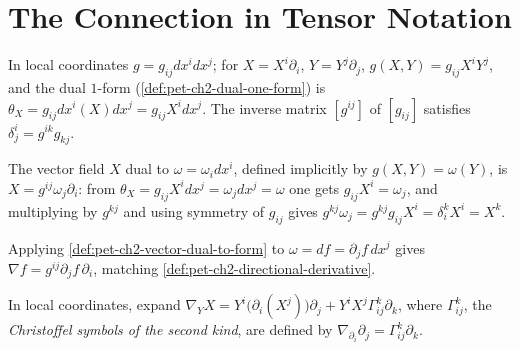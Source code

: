 \section{The Connection in Tensor Notation}

\begin{definition}
  \label{def:pet-ch2-metric-coordinate-formulas}
  \leanok
  In local coordinates $g=g_{ij}dx^idx^j$; for $X=X^i\partial_i$, $Y=Y^j\partial_j$,
  $g(X,Y)=g_{ij}X^iY^j$, and the dual $1$-form (\cref{def:pet-ch2-dual-one-form})
  is $\theta_X=g_{ij}dx^i(X)dx^j=g_{ij}X^idx^j$. The inverse matrix $[g^{ij}]$ of
  $[g_{ij}]$ satisfies $\delta^i_j=g^{ik}g_{kj}$.
\end{definition}

\begin{definition}
  \label{def:pet-ch2-vector-dual-to-form}
  \leanok
  The vector field $X$ dual to $\omega=\omega_idx^i$, defined implicitly by
  $g(X,Y)=\omega(Y)$, is $X=g^{ij}\omega_j\partial_i$: from $\theta_X=g_{ij}X^idx^j=\omega_jdx^j=\omega$
  one gets $g_{ij}X^i=\omega_j$, and multiplying by $g^{kj}$ and using symmetry
  of $g_{ij}$ gives $g^{kj}\omega_j=g^{kj}g_{ij}X^i=\delta^k_iX^i=X^k$.
\end{definition}

\begin{remark}
  \label{rem:pet-ch2-gradient-coordinate-formula}
  \leanok
  Applying \cref{def:pet-ch2-vector-dual-to-form} to $\omega=df=\partial_jf\,dx^j$
  gives $\nabla f=g^{ij}\partial_jf\,\partial_i$, matching
  \cref{def:pet-ch2-directional-derivative}.
\end{remark}

\begin{definition}
  \label{def:pet-ch2-christoffel-symbols-second-kind}
  \leanok
  In local coordinates, expand
  $\nabla_YX=Y^i\big(\partial_i(X^j)\big)\partial_j+Y^iX^j\Gamma^k_{ij}\partial_k$, where
  $\Gamma^k_{ij}$, the \emph{Christoffel symbols of the second kind}, are
  defined by $\nabla_{\partial_i}\partial_j=\Gamma^k_{ij}\partial_k$.
\end{definition}

